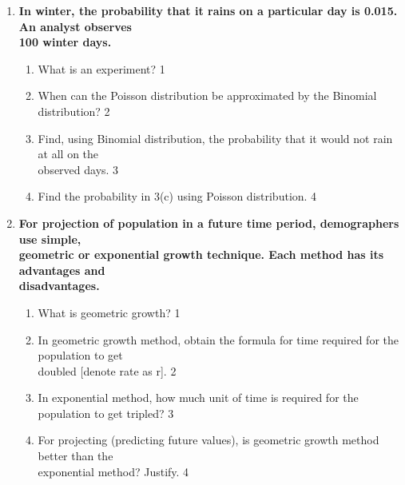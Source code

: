 \documentclass{article}
\begin{document}
\begin{enumerate}
  \item
  \textbf{In winter, the probability that it rains on a particular day is 0.015. An analyst observes \\ 100 winter days.}
 
  \begin{enumerate}
    \item
	What is an experiment? \hfill 1
    \item
    	When can the Poisson distribution be approximated by the Binomial distribution? \hfill 2
    \item
    	Find, using Binomial distribution, the probability that  it would not rain at all on the \\ observed days. \hfill 3
     \item
     	Find the probability in 3(c) using Poisson distribution.  \hfill 4
  \end{enumerate}

 \item
  \textbf{For projection of population in a future time period, demographers use simple, \\ geometric or exponential growth technique. Each method has its advantages and \\ disadvantages.}

  \begin{enumerate}
    \item
	What is geometric growth? \hfill 1
    \item
    	In geometric growth method, obtain the formula for time required for the population to get \\ doubled [denote rate as r]. \hfill 2
    \item
    	In exponential method, how much unit of time is required for the population to get tripled?  \hfill 3
     \item
     	For projecting (predicting future values), is geometric growth method better than the \\ exponential method? Justify.  \hfill 4
  \end{enumerate}
  
\end{enumerate}
\end{document}
